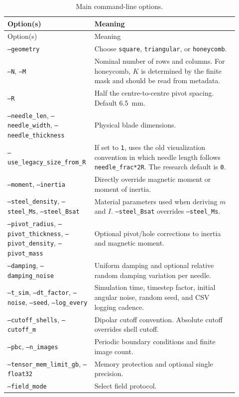 \documentclass[11pt,a4paper]{article}
\newcommand{\code}[1]{\texttt{#1}}
\begin{document}
\begin{longtable}{p{0.31\linewidth}p{0.61\linewidth}}
\caption{Main command-line options.}\label{tab:cli}\\
\toprule
Option(s) & Meaning \\
\midrule
\endfirsthead
\toprule
Option(s) & Meaning \\
\midrule
\endhead
\code{--geometry} & Choose \code{square}, \code{triangular}, or \code{honeycomb}. \\
\code{--N}, \code{--M} & Nominal number of rows and columns. For honeycomb, $K$ is determined by the finite mask and should be read from metadata. \\
\code{--R} & Half the centre-to-centre pivot spacing. Default \SI{6.5}{mm}. \\
\code{--needle\_len}, \code{--needle\_width}, \code{--needle\_thickness} & Physical blade dimensions. \\
\code{--use\_legacy\_size\_from\_R} & If set to \code{1}, uses the old visualization convention in which needle length follows \code{needle\_frac*2R}. The research default is \code{0}. \\
\code{--moment}, \code{--inertia} & Directly override magnetic moment or moment of inertia. \\
\code{--steel\_density}, \code{--steel\_Ms}, \code{--steel\_Bsat} & Material parameters used when deriving $m$ and $I$. \code{--steel\_Bsat} overrides \code{--steel\_Ms}. \\
\code{--pivot\_radius}, \code{--pivot\_thickness}, \code{--pivot\_density}, \code{--pivot\_mass} & Optional pivot/hole corrections to inertia and magnetic moment. \\
\code{--damping}, \code{--damping\_noise} & Uniform damping and optional relative random damping variation per needle. \\
\code{--t\_sim}, \code{--dt\_factor}, \code{--noise}, \code{--seed}, \code{--log\_every} & Simulation time, timestep factor, initial angular noise, random seed, and CSV logging cadence. \\
\code{--cutoff\_shells}, \code{--cutoff\_m} & Dipolar cutoff convention. Absolute cutoff overrides shell cutoff. \\
\code{--pbc}, \code{--n\_images} & Periodic boundary conditions and finite image count. \\
\code{--tensor\_mem\_limit\_gb}, \code{--float32} & Memory protection and optional single precision. \\
\code{--field\_mode} & Select field protocol. \\

\end{longtable}
\end{document}

